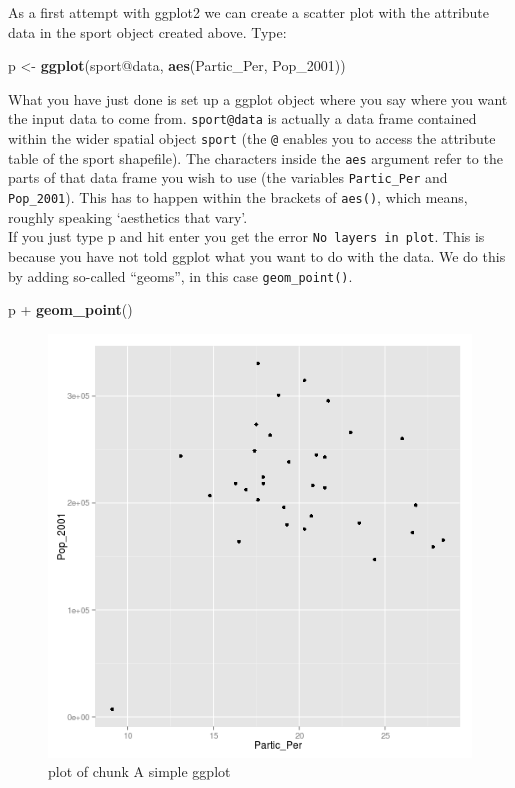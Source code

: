 \documentclass[]{article}
\makeatletter
\newenvironment{Shaded}{}{}
\newcommand{\KeywordTok}[1]{\textcolor[rgb]{0.00,0.44,0.13}{\textbf{{#1}}}}
\newcommand{\NormalTok}[1]{{#1}}
\def\maxwidth{\ifdim\Gin@nat@width>\linewidth\linewidth
\else\Gin@nat@width\fi}
\let\Oldincludegraphics\includegraphics
\renewcommand{\includegraphics}[1]{\Oldincludegraphics[width=\maxwidth]{#1}}
\makeatother
\begin{document}
As a first attempt with ggplot2 we can create a scatter plot with the
attribute data in the sport object created above. Type:

\begin{Shaded}
\begin{Highlighting}[]
\NormalTok{p <- }\KeywordTok{ggplot}\NormalTok{(sport@data, }\KeywordTok{aes}\NormalTok{(Partic_Per, Pop_2001))}
\end{Highlighting}
\end{Shaded}
What you have just done is set up a ggplot object where you say where
you want the input data to come from. \texttt{sport@data} is actually a
data frame contained within the wider spatial object \texttt{sport} (the
\texttt{@} enables you to access the attribute table of the sport
shapefile). The characters inside the \texttt{aes} argument refer to the
parts of that data frame you wish to use (the variables
\texttt{Partic\_Per} and \texttt{Pop\_2001}). This has to happen within
the brackets of \texttt{aes()}, which means, roughly speaking
`aesthetics that vary'.\\If you just type p and hit enter you get the
error \texttt{No layers in plot}. This is because you have not told
ggplot what you want to do with the data. We do this by adding so-called
``geoms'', in this case \texttt{geom\_point()}.

\begin{Shaded}
\begin{Highlighting}[]
\NormalTok{p + }\KeywordTok{geom_point}\NormalTok{()}
\end{Highlighting}
\end{Shaded}
\begin{figure}[htbp]
\centering
\includegraphics{figure/A_simple_ggplot.png}
\caption{plot of chunk A simple ggplot}
\end{figure}
\end{document}
